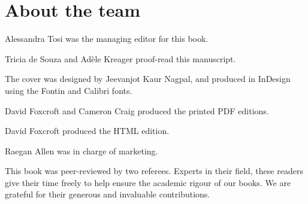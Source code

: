 \printendnotes
\newpage

\chapter{About the team}

Alessandra Tosi was the managing editor for this book.

Tricia de Souza and Adèle Kreager proof-read this manuscript.

The cover was designed by Jeevanjot Kaur Nagpal, and produced in InDesign using the Fontin and Calibri fonts.

David Foxcroft and Cameron Craig produced the printed PDF editions. 

David Foxcroft produced the HTML edition.

Raegan Allen was in charge of marketing.

This book was peer-reviewed by two referees. Experts in their field, these readers give their time freely to help ensure the academic rigour of our books. We are grateful for their generous and invaluable contributions.

\newpage


%

